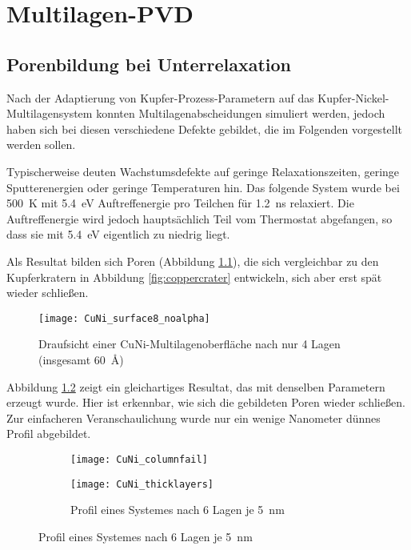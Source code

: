 \chapter{Multilagen-PVD}
\label{appendix:multilayer}

\section{Porenbildung bei Unterrelaxation}

Nach der Adaptierung von Kupfer-Prozess-Parametern auf das Kupfer-Nickel-Multilagensystem konnten Multilagenabscheidungen simuliert werden, jedoch haben sich bei diesen verschiedene Defekte gebildet, die im Folgenden vorgestellt werden sollen.

Typischerweise deuten Wachstumsdefekte auf geringe Relaxationszeiten, geringe Sputterenergien oder geringe Temperaturen hin.
Das folgende System wurde bei \SI{500}{\kelvin} mit \SI{5.4}{\electronvolt} Auftreffenergie pro Teilchen für \SI{1.2}{\nano\second} relaxiert.
Die Auftreffenergie wird jedoch hauptsächlich Teil vom Thermostat abgefangen, so dass sie mit \SI{5.4}{\electronvolt} eigentlich zu niedrig liegt.

Als Resultat bilden sich Poren (Abbildung \ref{fig:multilayer_surfacefail}), die sich vergleichbar zu den Kupferkratern in Abbildung \ref{fig:coppercrater} entwickeln, sich aber erst spät wieder schließen.

\begin{figure}[h]
  \centering
  \texttt{[image: CuNi\_surface8\_noalpha]}
  \caption{Draufsicht einer CuNi-Multi\-lagen\-ober\-fläche nach nur 4 Lagen (insgesamt \SI{60}{\angstrom})}
  \label{fig:multilayer_surfacefail}
\end{figure}

\clearpage
Abbildung \ref{fig:multilayer_columnfail} zeigt ein gleichartiges Resultat, das mit denselben Parametern erzeugt wurde.
Hier ist erkennbar, wie sich die gebildeten Poren wieder schließen.
Zur einfacheren Veranschaulichung wurde nur ein wenige Nanometer dünnes Profil abgebildet.

\begin{figure}[h]
  \captionsetup[subfigure]{singlelinecheck=false}
  \def\subfigwidth{7cm}
  \begin{subfigure}[t]{\subfigwidth}
    \texttt{[image: CuNi\_columnfail]}
    \label{fig:multilayer_columnfail}
  \end{subfigure}
  \hfill
  \begin{subfigure}[t]{\subfigwidth}
    \texttt{[image: CuNi\_thicklayers]}
    \caption{Profil eines Systemes nach 6 Lagen je \SI{5}{\nano\meter}}
    \label{fig:multilayer_thickfail}
  \end{subfigure}
  \hfill
\end{figure}


